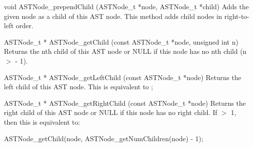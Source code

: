 \documentclass{sbmlmanual}
\begin{document}
\begin{methoddef}{void ASTNode\_prependChild (ASTNode\_t *node, ASTNode\_t *child)}
  Adds the given node as a child of this AST node.  This method adds child
  nodes in right-to-left order.
\end{methoddef}


\begin{methoddef}{ASTNode\_t * ASTNode\_getChild (const ASTNode\_t *node, unsigned int n)}
  Returns the nth child of this AST node or NULL if this node has no nth
  child (n $>$  - 1).
\end{methoddef}


\begin{methoddef}{ASTNode\_t * ASTNode\_getLeftChild (const ASTNode\_t *node)}
  Returns the left child of this AST node.  This is equivalent to
  ;
\end{methoddef}


\begin{methoddef}{ASTNode\_t * ASTNode\_getRightChild (const ASTNode\_t *node)}
  Returns the right child of this AST node or NULL if this node has no
  right child.  If  $>$ 1, then this is
  equivalent to:
  \begin{cVerbatim}
    ASTNode_getChild(node, ASTNode_getNumChildren(node) - 1);
  \end{cVerbatim}
\end{methoddef}
\end{document}
